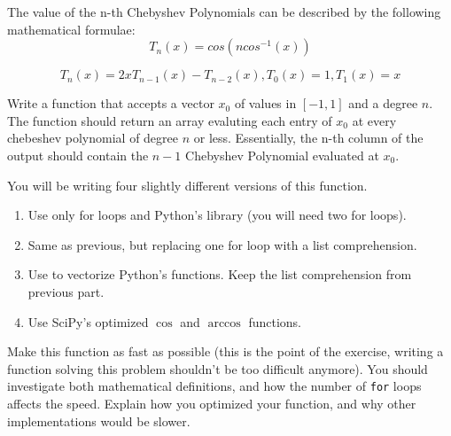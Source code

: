 The value of the n-th Chebyshev Polynomials can be described by the following mathematical formulae\footnotemark :
\[
T_n(x) = cos(n cos^{-1}(x))
\]

\[
T_n(x) = 2xT_{n-1}(x) - T_{n-2}(x), T_0(x) = 1, T_1(x) = x
\]


\begin{problem}
Write a function that accepts a vector $x_0$ of values in $[-1,1]$ and a degree $n$.  The function should return an array evaluting each entry of $x_0$ at every chebeshev polynomial of degree $n$ or less. Essentially, the n-th column of the output should contain the $n-1$ Chebyshev Polynomial evaluated at $x_0$. 

You will be writing four slightly different versions of this function.
\begin{enumerate}
\item Use only for loops and Python's  library (you will need two for loops).
\item Same as previous, but replacing one for loop with a list comprehension.
\item Use  to vectorize Python's  functions.  Keep the list comprehension from previous part.
\item Use SciPy's optimized $\cos$ and $\arccos$ functions.
\end{enumerate}

Make this function as fast as possible (this is the point of the exercise, writing a function solving this problem shouldn't be too difficult anymore). You should investigate both mathematical definitions, and how the number of {\tt for} loops affects the speed. Explain how you optimized your function, and why other implementations would be slower.
\end{problem}
